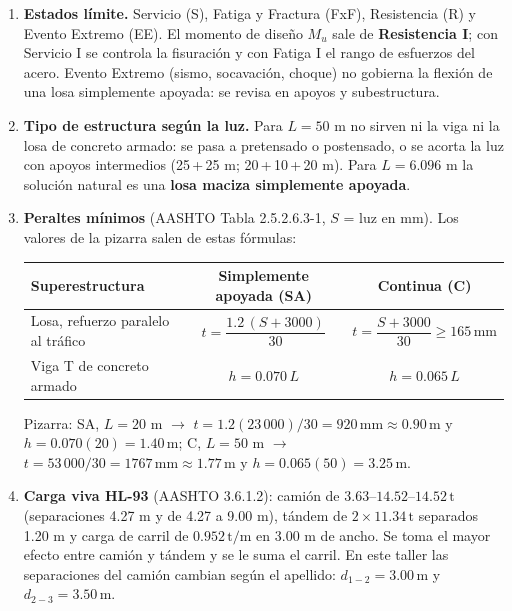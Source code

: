 \documentclass[11pt,a4paper]{article}
\newcommand{\uT}{\,\mathrm{t}}
\newcommand{\uTpm}{\,\mathrm{t/m}}
\newcommand{\uM}{\,\mathrm{m}}
\newcommand{\uMm}{\,\mathrm{mm}}
\begin{document}
\begin{enumerate}[leftmargin=*,label=\textbf{\arabic*.},itemsep=3pt]
\item \textbf{Estados límite.} Servicio (S), Fatiga y Fractura (FxF), Resistencia (R) y Evento Extremo (EE).
  El momento de diseño $M_u$ sale de \textbf{Resistencia I}; con Servicio I se controla la fisuración y con
  Fatiga I el rango de esfuerzos del acero. Evento Extremo (sismo, socavación, choque) no gobierna la flexión
  de una losa simplemente apoyada: se revisa en apoyos y subestructura.
\item \textbf{Tipo de estructura según la luz.} Para $L = 50$ m no sirven ni la viga ni la losa de concreto
  armado: se pasa a pretensado o postensado, o se acorta la luz con apoyos intermedios (25\,+\,25 m;
  20\,+\,10\,+\,20 m). Para $L = 6.096$ m la solución natural es una \textbf{losa maciza simplemente apoyada}.
\item \textbf{Peraltes mínimos} (AASHTO Tabla 2.5.2.6.3-1, $S$ = luz en mm). Los valores de la pizarra
  salen de estas fórmulas:

  \begin{center}\small
  \begin{tabular}{lcc}
  \toprule
  Superestructura & Simplemente apoyada (SA) & Continua (C)\\
  \midrule
  Losa, refuerzo paralelo al tráfico & $t = \dfrac{1.2\,(S+3000)}{30}$ & $t = \dfrac{S+3000}{30} \ge 165\uMm$\\[10pt]
  Viga T de concreto armado & $h = 0.070\,L$ & $h = 0.065\,L$\\
  \bottomrule
  \end{tabular}
  \end{center}
  Pizarra: SA, $L = 20$ m $\rightarrow$ $t = 1.2(23\,000)/30 = 920\uMm \approx 0.90\uM$ y $h = 0.070(20) = 1.40\uM$;
  C, $L = 50$ m $\rightarrow$ $t = 53\,000/30 = 1767\uMm \approx 1.77\uM$ y $h = 0.065(50) = 3.25\uM$.
\item \textbf{Carga viva HL-93} (AASHTO 3.6.1.2): camión de $3.63$--$14.52$--$14.52\uT$ (separaciones 4.27 m y
  de 4.27 a 9.00 m), tándem de $2\times 11.34\uT$ separados 1.20 m y carga de carril de $0.952\uTpm$ en 3.00 m
  de ancho. Se toma el mayor efecto entre camión y tándem y se le suma el carril. En este taller las
  separaciones del camión cambian según el apellido: $d_{1-2} = 3.00\uM$ y $d_{2-3} = 3.50\uM$.
\end{enumerate}

\end{document}
